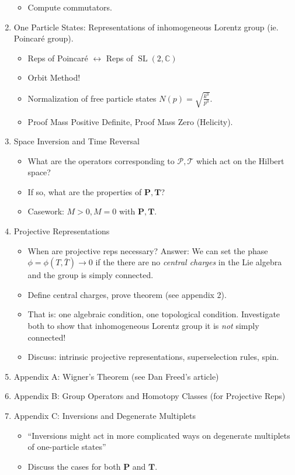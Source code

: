 \documentclass[10pt]{article}
\newcommand{\bC}{\mathbb{C}}
\newcommand{\ms}{\mathscr}
\newcommand{\SFR}[2]{\sqrt{\frac{#1}{#2}}}
\theoremstyle{plain}
\theoremstyle{definition}
\theoremstyle{remark}
\DeclareMathOperator{\SL}{SL}
\newcommand{\colr}[1]{ {\color{red}  #1 } }
\begin{document}
\begin{enumerate}
\begin{itemize}
            \item Compute commutators.
        \end{itemize}
    \item One Particle States: Representations of inhomogeneous Lorentz group (ie. Poincar\'e group).
        \begin{itemize}
            \item Reps of Poincar\'e $\leftrightarrow$ Reps of $\SL(2,\bC)$ %
            \item Orbit Method!
            \item Normalization of free particle states $N(p) = \SFR{k^0}{p^0}$.
            \item Proof Mass Positive Definite, Proof Mass Zero (Helicity).
        \end{itemize}
    \item Space Inversion and Time Reversal
        \begin{itemize}
            \item What are the operators corresponding to $\ms P,\ms T$ which act on the Hilbert space?
            \item If so, what are the properties of $\bm P, \bm{T}$?
            \item Casework: $M>0, M=0$ with $\bm P, \bm T$.
        \end{itemize}
    \item Projective Representations
        \begin{itemize}
            \item When are projective reps necessary? Answer: We can
                set the phase $\phi=\phi(T,\bar T) \to 0$ if the there
                are no \emph{central charges} in the Lie algebra and
                the group is simply connected.
            \item Define central charges, prove theorem (see appendix 2).
            \item That is: one algebraic condition, one topological
                condition. Investigate both to show that
                inhomogeneous Lorentz group it is \emph{not} simply
                connected!
            \item Discuss: intrinsic projective representations,
                superselection rules, spin.
        \end{itemize}
    \item Appendix A: Wigner's Theorem (see Dan Freed's article)
    \item Appendix B: Group Operators and Homotopy Classes (for Projective Reps)
    \item Appendix C: Inversions and Degenerate Multiplets
        \begin{itemize}
            \item ``Inversions might act in more complicated ways on
                degenerate multiplets of one-particle states''
            \item Discuss the cases for both $\bm P$ and $\bm T$.
        \end{itemize}
\end{enumerate}
\end{document}
